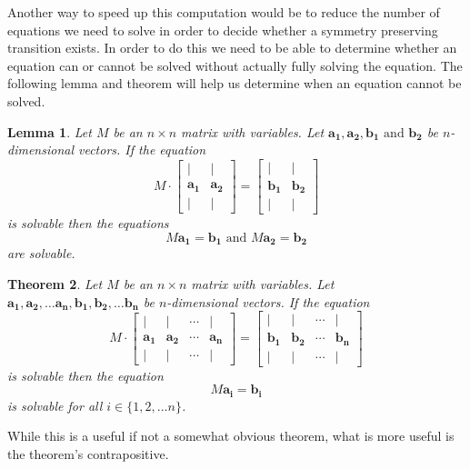 \documentclass[a4paper,10pt]{article}
\theoremstyle{plain}
\newtheorem{Theorem}{Theorem}
\newtheorem{Lemma}[Theorem]{Lemma}
\theoremstyle{definition}
\theoremstyle{remark}
\renewcommand{\vec}[1]{\mathbf{#1}}
\begin{document}
Another way to speed up this computation would be to reduce the number of equations we need to solve in order to decide whether a symmetry preserving transition exists.
In order to do this we need to be able to determine whether an equation can or cannot be solved without actually fully solving the equation.
The following lemma and theorem will help us determine when an equation cannot be solved.
\begin{Lemma}
	Let \( M \) be an \( n \times n \) matrix with variables.
	Let \( \vec{a_1}, \vec{a_2}, \vec{b_1} \text{ and } \vec{b_2} \) be \( n \)-dimensional vectors.
	If the equation \[
	M
	\cdot
	\begin{bmatrix}
		| & | \\
		\vec{a_1} & \vec{a_2} \\
		| & |
	\end{bmatrix}
	=
	\begin{bmatrix}
		| & | \\
		\vec{b_1} & \vec{b_2} \\
		| & |
	\end{bmatrix}
	\]
	is solvable then the equations \[M\vec{a_1} = \vec{b_1} \text{ and } M\vec{a_2} = \vec{b_2}\] are solvable.
\end{Lemma}
\begin{Theorem}
	Let \( M \) be an \( n \times n \) matrix with variables.
	Let \( \vec{a_1}, \vec{a_2}, \dots \vec{a_n}, \vec{b_1}, \vec{b_2}, \dots \vec{b_n} \) be \( n \)-dimensional vectors.
	If the equation \[
	M
	\cdot
	\begin{bmatrix}
		| & | & \cdots & |\\
		\vec{a_1} & \vec{a_2} & \cdots & \vec{a_n} \\
		| & | & \cdots & |
	\end{bmatrix}
	=
	\begin{bmatrix}
		| & | & \cdots & |\\
		\vec{b_1} & \vec{b_2} & \cdots & \vec{b_n} \\
		| & | & \cdots & |
	\end{bmatrix}
	\]
	is solvable then the equation \[M\vec{a_i} = \vec{b_i}\] is solvable for all \( i \in \{1, 2, \dots n\} \).
	\label{thrm:matrix-equation-solving}
\end{Theorem}
\noindent While this is a useful if not a somewhat obvious theorem, what is more useful is the theorem's contrapositive.
\end{document}
